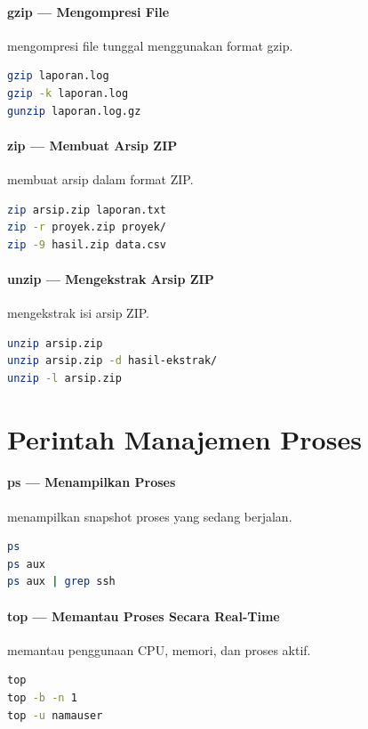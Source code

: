 \paragraph*{gzip --- Mengompresi File}
 mengompresi file tunggal menggunakan format gzip.
\begin{lstlisting}[language=bash]
gzip laporan.log
gzip -k laporan.log
gunzip laporan.log.gz
\end{lstlisting}

\paragraph*{zip --- Membuat Arsip ZIP}
 membuat arsip dalam format ZIP.
\begin{lstlisting}[language=bash]
zip arsip.zip laporan.txt
zip -r proyek.zip proyek/
zip -9 hasil.zip data.csv
\end{lstlisting}

\paragraph*{unzip --- Mengekstrak Arsip ZIP}
 mengekstrak isi arsip ZIP.
\begin{lstlisting}[language=bash]
unzip arsip.zip
unzip arsip.zip -d hasil-ekstrak/
unzip -l arsip.zip
\end{lstlisting}

\section{Perintah Manajemen Proses}

\paragraph*{ps --- Menampilkan Proses}
 menampilkan snapshot proses yang sedang berjalan.
\begin{lstlisting}[language=bash]
ps
ps aux
ps aux | grep ssh
\end{lstlisting}

\paragraph*{top --- Memantau Proses Secara Real-Time}
 memantau penggunaan CPU, memori, dan proses aktif.
\begin{lstlisting}[language=bash]
top
top -b -n 1
top -u namauser
\end{lstlisting}

